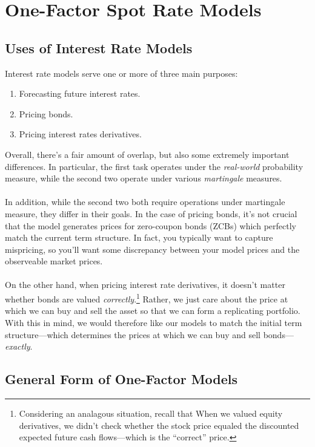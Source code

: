 \documentclass[a4paper,12pt]{scrartcl}
\begin{document}
\newpage
\section{One-Factor Spot Rate Models}

\subsection{Uses of Interest Rate Models}

Interest rate models serve one or more of three main purposes:
\begin{enumerate}
   \item Forecasting future interest rates.
   \item Pricing bonds.
   \item Pricing interest rates derivatives.
\end{enumerate}
Overall, there's a fair amount of overlap, but also some extremely
important differences. In particular, the first task operates under
the \emph{real-world} probability measure, while the second two
operate under various \emph{martingale} measures.
\\
\\
In addition, while the second two both require operations under 
martingale measure, they differ in their goals. In the case of pricing
bonds, it's not crucial that the model generates prices for zero-coupon
bonds (ZCBs) which perfectly match the current term structure. In fact,
you typically want to capture mispricing, so you'll want some discrepancy
between your model prices and the observeable market prices.
\\
\\
On the other hand, when pricing interest rate derivatives, it doesn't
matter whether bonds are valued \emph{correctly}.\footnote{Considering an
analagous situation, recall that When we valued equity
derivatives, we didn't check whether the stock price equaled the
discounted expected future cash flows---which is the ``correct''
price.} Rather, we just care about the price at which we can buy and sell
the asset so that we can form a replicating portfolio. With this in 
mind, we would therefore like our models to match the initial term
structure---which determines the prices at which we can buy and sell 
bonds---\emph{exactly}.

\newpage 
\subsection{General Form of One-Factor Models}
\end{document}
